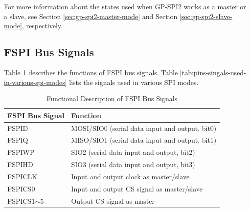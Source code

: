 \documentclass[main\_\_EN.tex]{subfiles}
\begin{document}
For more information about the states used when GP-SPI2 works as a master or a slave, see Section \ref{sec:gp-spi2-master-mode} and Section \ref{sec:gp-spi2-slave-mode}, respectively.

\subsection{FSPI Bus Signals}

Table \ref{table:SPI_signals} describes the functions of FSPI bus signals. Table \ref{tab:pins-singals-used-in-various-spi-modes} lists the signals used in various SPI modes.


\begin{ThreePartTable}

\begin{longtable}[c]{|p{3.0cm}|l|}
\caption{Functional Description of FSPI Bus Signals}
\label{table:SPI_signals}\\
\hline

    \rowcolor{lightgray}
    \textbf{FSPI Bus Signal}& \textbf{Function} \\
    \hline
    \endfirsthead

    \endlastfoot
    FSPID & MOSI/SIO0 (serial data input and output, bit0) \\
    \hline
    FSPIQ & MISO/SIO1 (serial data input and output, bit1) \\\hline
    FSPIWP & SIO2 (serial data input and output, bit2) \\\hline
    FSPIHD & SIO3 (serial data input and output, bit3) \\\hline
    FSPICLK & Input and output clock as master/slave \\\hline
    FSPICS0 & Input and output CS signal as master/slave\\\hline
    FSPICS1$\sim$5 & Output CS signal as master\\\hline
\end{longtable}

\end{ThreePartTable}
\end{document}
